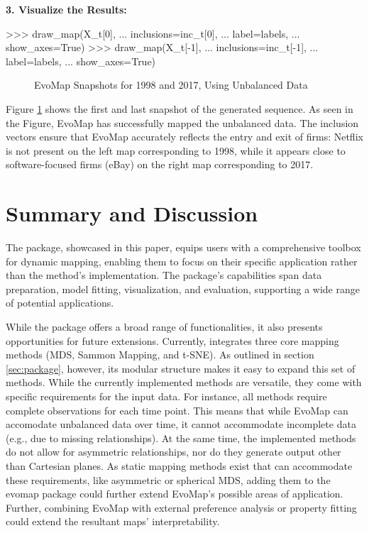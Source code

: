 \documentclass[article]{jss}
\begin{document}
\textbf{3. Visualize the Results:}

\begin{CodeChunk}
\begin{CodeInput}
>>> draw_map(X_t[0], 
...     inclusions=inc_t[0], 
...     label=labels, 
...     show_axes=True)
>>> draw_map(X_t[-1], 
...     inclusions=inc_t[-1], 
...     label=labels, 
...     show_axes=True)
\end{CodeInput}
\end{CodeChunk}
  
\begin{figure}[hbt!]
  \centering
  \caption{\label{fig:unbalanced-data} EvoMap Snapshots for 1998 and 2017, Using Unbalanced Data}
\end{figure}

Figure \ref{fig:unbalanced-data} shows the first and last snapshot of the generated sequence. As seen in the Figure,
EvoMap has successfully mapped the unbalanced data. The inclusion vectors ensure that EvoMap accurately reflects the 
entry and exit of firms: Netflix is not present on the left map corresponding to 1998, while it appears close to 
software-focused firms (eBay) on the right map corresponding to 2017.


\section{Summary and Discussion} \label{sec:summary}

The  package, showcased in this paper, equips users with a comprehensive toolbox for dynamic mapping, 
enabling them to focus on their specific application rather than the method's implementation. The package's 
capabilities span data preparation, model fitting, visualization, and evaluation, supporting a wide range of potential
applications.

While the package offers a broad range of functionalities, it also presents opportunities for future extensions. 
Currently,  integrates three core mapping methods (MDS, Sammon Mapping, and t-SNE). As outlined in 
section \ref{sec:package}, however, its modular structure makes it easy to expand this set of methods. While the currently
implemented methods are versatile, they come with specific requirements for the input data. 
For instance, all methods require complete observations for each time point. This means that while EvoMap 
can accomodate unbalanced data over time, it cannot accommodate incomplete data (e.g., due to missing relationships). 
At the same time, the implemented methods do not allow for asymmetric relationships, nor do they generate output other than Cartesian planes.
As static mapping methods exist that can accommodate these requirements, like asymmetric or
spherical MDS, adding them to the evomap package could further extend EvoMap's possible areas of application. Further, 
combining EvoMap with external preference analysis or property fitting could extend the resultant maps' interpretability.
\end{document}
